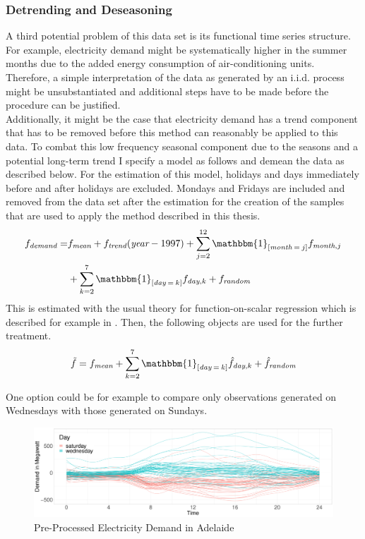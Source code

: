 \documentclass[12pt, a4paper]{article}
\theoremstyle{MAstyle} \newtheorem{assumption}{Assumption}[section]
\theoremstyle{MAstyle} \newtheorem{definition}{Definition}[section]
\theoremstyle{MAstyle} \newtheorem{theorem}{Theorem}[section]
\begin{document}
			\subsubsection{Detrending and Deseasoning}
			A third potential problem of this data set is its functional time series structure. For example, electricity demand might be systematically higher in the summer months due to the added energy consumption of air-conditioning units. Therefore, a simple interpretation of the data as generated by an i.i.d. process might be unsubstantiated and additional steps have to be made before the procedure can be justified. \\
			Additionally, it might be the case that electricity demand has a trend component that has to be removed before this method can reasonably be applied to this data. To combat this low frequency seasonal component due to the seasons and a potential long-term trend I specify a model as follows and demean the data as described below. For the estimation of this model, holidays and days immediately before and after holidays are excluded. Mondays and Fridays are included and removed from the data set after the estimation for the creation of the samples that are used to apply the method described in this thesis.
			\begin{equation}\label{Data_Cleaning}
				\begin{split}
					f_{\textit{demand}} = &f_{\textit{mean}} + f_{\textit{trend}}(\textit{year} - 1997) + \sum_{j = 2}^{12}\mathbbm{1}_{\left[\textit{month}\: = \: j\right]}f_{\textit{month}, j}\\
					 &+ \sum_{k = 2}^{7}\mathbbm{1}_{\left[\textit{day}\: = \: k\right]}f_{\textit{day}, k} + f_{\textit{random}}
				\end{split}	
			\end{equation}
			This is estimated with the usual theory for function-on-scalar regression which is described for example in \cite{ramsay_functional_2005}. Then, the following objects are used for the further treatment.
			\begin{equation}
				\tilde{f} = f_{\textit{mean}} + \sum_{k = 2}^{7}\mathbbm{1}_{\left[\textit{day}\: = \: k\right]}\hat{f}_{\textit{day}, k} + \hat{f}_{\textit{random}}
			\end{equation}
			
			One option could be for example to compare only observations generated on Wednesdays with those generated on Sundays.
			
			\begin{figure}[H]
				\includegraphics[width=\textwidth]{../Graphics/electricity_demand_curves_cleaned.PDF}
				\caption{Pre-Processed Electricity Demand in Adelaide}
				\label{electricity_demand_cleaned}
			\end{figure}
	
\end{document}
